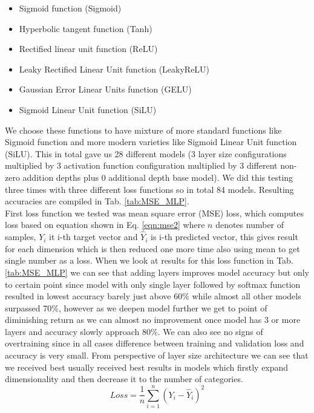 \begin{itemize}
	\item Sigmoid function (Sigmoid)
	\item Hyperbolic tangent function (Tanh)
	\item Rectified linear unit function (ReLU)
	\item Leaky Rectified Linear Unit function (LeakyReLU)
	\item Gaussian Error Linear Units function (GELU)
	\item Sigmoid Linear Unit function (SiLU)
\end{itemize}

We choose these functions to have mixture of more standard functions like Sigmoid function and more modern varieties like Sigmoid Linear Unit function (SiLU). This in total gave us 28 different models (3 layer size configurations multiplied by 3 activation function configuration multiplied by 3 different non-zero addition depths plus 0 additional depth base model). We did this testing three times with three different loss functions so in total 84 models. Resulting accuracies are compiled in Tab. \ref{tab:MSE_MLP}.
\\


First loss function we tested was mean square error (MSE) loss, which computes loss based on equation shown in Eq. \ref{eqn:mse2} where $n$ denotes number of samples, $Y_i$ it i-th target vector and $\hat{Y}_i$ is i-th predicted vector, this gives result for each dimension which is then reduced one more time also using mean to get single number as a loss. When we look at results for this loss function in Tab. \ref{tab:MSE_MLP} we can see that adding layers improves model accuracy but only to certain point since model with only single layer followed by softmax function resulted in lowest accuracy barely just above 60\% while almost all other models surpassed 70\%, however as we deepen model further we get to point of diminishing return as we can almost no improvement once model has 3 or more layers and accuracy slowly approach 80\%. We can also see no signs of overtraining since in all cases difference between training and validation loss and accuracy is very small. From perspective of layer size architecture we can see that we received best usually received best results in models which firstly expand dimensionality and then decrease it to the number of categories. 
\\

\begin{equation}
	\label{eqn:mse2}
	Loss = \frac{1}{n}\sum_{i=1}^{n}(Y_i - \hat{Y}_i)^2
\end{equation}

